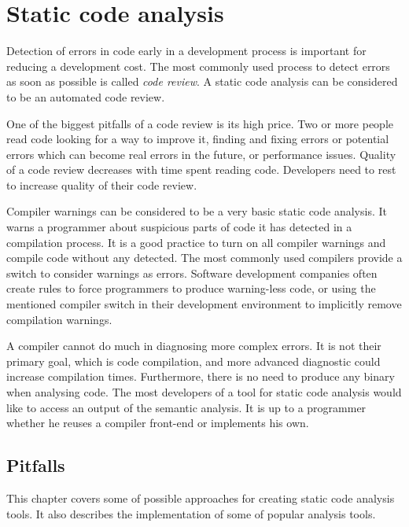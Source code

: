\chapter{Static code analysis}
Detection of errors in code early in a development process is important for reducing a development cost. The most commonly used process to detect errors as soon as possible is called \emph{code review}. A static code analysis can be considered to be an automated code review.

One of the biggest pitfalls of a code review is its high price. Two or more people read code looking for a way to improve it, finding and fixing errors or potential errors which can become real errors in the future, or performance issues. Quality of a code review decreases with time spent reading code. Developers need to rest to increase quality of their code review.

Compiler warnings can be considered to be a very basic static code analysis. It warns a programmer about suspicious parts of code it has detected in a compilation process. It is a good practice to turn on all compiler warnings and compile code without any detected. The most commonly used compilers provide a switch to consider warnings as errors. Software development companies often create rules to force programmers to produce warning-less code, or using the mentioned compiler switch in their development environment to implicitly remove compilation warnings.

A compiler cannot do much in diagnosing more complex errors. It is not their primary goal, which is code compilation, and more advanced diagnostic could increase compilation times. Furthermore, there is no need to produce any binary when analysing code. The most developers of a tool for static code analysis would like to access an output of the semantic analysis. It is up to a programmer whether he reuses a compiler front-end or implements his own.

\section{Pitfalls}
This chapter covers some of possible approaches for creating static code analysis tools. It also describes the implementation of some of popular analysis tools.

